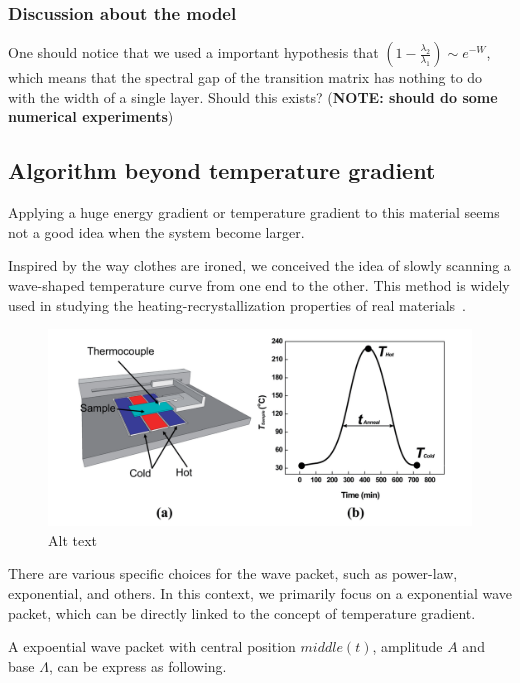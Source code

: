 \documentclass[twocolumn,superscriptaddress,english,showpacs,longbibliography]{revtex4-2}
\begin{document}
\subsubsection{Discussion about the
model}\label{discussion-about-the-model}

One should notice that we used a important hypothesis that
$(1-\frac{\lambda_2}{\lambda_1}) \sim e^{-W}$, which means that the
spectral gap of the transition matrix has nothing to do with the width
of a single layer. Should this exists? (\textbf{NOTE: should do some
numerical experiments})

\subsection{Algorithm beyond temperature
gradient}\label{algorithm-beyond-temperature-gradient}

Applying a huge energy gradient or temperature gradient to this material
seems not a good idea when the system become larger.

Inspired by the way clothes are ironed, we conceived the idea of slowly
scanning a wave-shaped temperature curve from one end to the other. This
method is widely used in studying the heating-recrystallization
properties of real materials~\cite{Zhang2014}.

\begin{figure}
\centering
\includegraphics[width=\columnwidth]{../notes/images/zhang2014.png}
\caption{Alt text}
\end{figure}

There are various specific choices for the wave packet, such as
power-law, exponential, and others. In this context, we primarily focus
on a exponential wave packet, which can be directly linked to the
concept of temperature gradient.

A expoential wave packet with central position $middle(t)$, amplitude
$A$ and base $\Lambda$, can be express as following.
\end{document}
